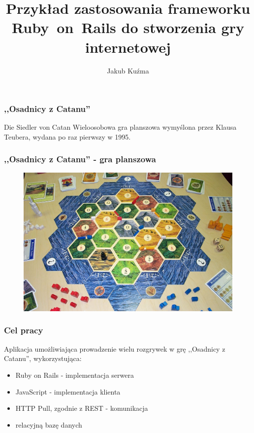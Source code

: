 \documentclass[12pt]{beamer}
\author{Jakub Kuźma}
\title{Przykład zastosowania frameworku Ruby~on~Rails do stworzenia
  gry internetowej}
\begin{document}
\frame{\titlepage}

\begin{frame}
  \frametitle{,,Osadnicy z Catanu''}
  \begin{block}{Die Siedler von Catan}
    Wieloosobowa gra planszowa wymyślona przez Klausa Teubera, wydana
    po raz pierwszy w 1995.
  \end{block}
\end{frame}

\begin{frame}
  \frametitle{,,Osadnicy z Catanu'' - gra planszowa}
  \begin{figure}
    \includegraphics[width=\linewidth]{settlers.jpg}
  \end{figure}
\end{frame}

\begin{frame}
  \frametitle{Cel pracy}
  Aplikacja umożliwiająca prowadzenie wielu rozgrywek w grę ,,Osadnicy
  z Catanu'', wykorzystująca:
  \begin{itemize}
  \item Ruby on Rails - implementacja serwera
  \item JavaScript - implementacja klienta
  \item HTTP Pull, zgodnie z REST - komunikacja
  \item relacyjną bazę danych
  \end{itemize}
\end{frame}
\end{document}
